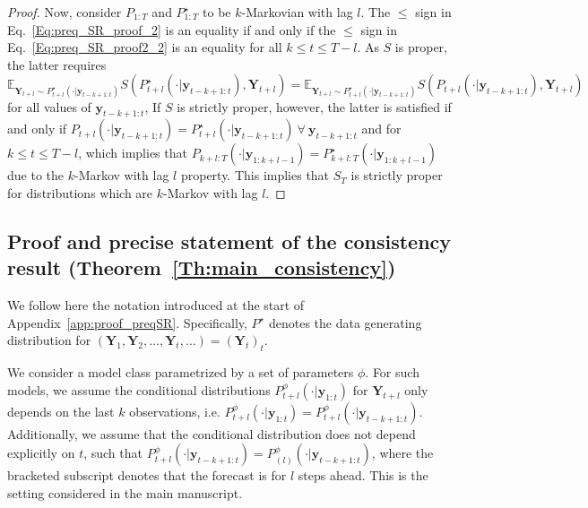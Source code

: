 \documentclass[twoside,11pt]{article}
\newcommand{\E}{\mathbb{E}}
\newcommand{\ddobs}{\mathbf{y}}
\newcommand{\Ddobs}{\mathbf{Y}}
\newcommand{\ddobsuptminus}{\mathbf{y}_{t-k+1:t}}
\newcommand{\ddobsupt}{\mathbf{y}_{1:t}}
\begin{document}
\begin{proof}
		Now, consider $ P_{1:T} $ and $ P_{1:T}^\star $ to be $ k $-Markovian with lag $ l $. The $ \le $ sign in Eq.~\eqref{Eq:preq_SR_proof_2} is an equality if and only if the $ \le  $ sign in Eq.~\eqref{Eq:preq_SR_proof2_2} is an equality for all $ k\le t \le T-l $. As $ S $ is proper, the latter requires $$ \E_{\Ddobs_{t+l}\sim P^\star_{t+l}(\cdot|\ddobs_{t-k+1:t})}  S(P^\star_{t+l}(\cdot|\ddobsuptminus), \Ddobs_{t+l}) = \E_{\Ddobs_{t+l}\sim P^\star_{t+l}(\cdot|\ddobs_{t-k+1:t})}  S(P_{t+l}(\cdot|\ddobsuptminus), \Ddobs_{t+l}) $$ for all values of $ \ddobsuptminus $, If $ S $ is strictly proper, however, the latter is satisfied if and only if $ P_{t+l}(\cdot|\ddobs_{t-k+1:t}) = P^\star_{t+l}(\cdot|\ddobsuptminus)\ \forall \ \ddobsuptminus  $ and for $  k\le t\le T-l $, which implies that $  P_{k+l:T}(\cdot|\ddobs_{1:k+l-1})=P_{k+l:T}^\star (\cdot|\ddobs_{1:k+l-1}) $ due to the $ k $-Markov with lag $ l $ property. This implies that $ S_T $ is strictly proper for distributions which are $ k $-Markov with lag $ l $.
	\end{proof}
	
	
	
	
	
	
	
	\subsection{Proof and precise statement of the consistency result (Theorem~\ref{Th:main_consistency})}\label{app:consistency}
	
	
	
	
	
	
	
	
	
	
	We follow here the notation introduced at the start of Appendix~\ref{app:proof_preqSR}. Specifically, $ P^\star $ denotes the data generating distribution for $ (\Ddobs_1, \Ddobs_2, \ldots, \Ddobs_t, \ldots)  = (\Ddobs_t)_t$. 
	
	We consider a model class parametrized by a set of parameters $ \phi $. For such models, we assume the conditional distributions $ P^\phi_{t+l}(\cdot|\ddobs_{1:t}) $ for $ \Ddobs_{t+l} $ only depends on the last $ k $ observations, i.e. $ P^\phi_{t+l}(\cdot|\ddobsupt) =P^\phi_{t+l}(\cdot|\ddobsuptminus) $. Additionally, we assume that the conditional distribution does not depend explicitly on $ t $, such that $ P^\phi_{t+l}(\cdot|\ddobsuptminus) = P^\phi_{(l)}(\cdot|\ddobsuptminus) $, where the bracketed subscript denotes that the forecast is for $ l $ steps ahead. This is the setting considered in the main manuscript.
	
\end{document}
